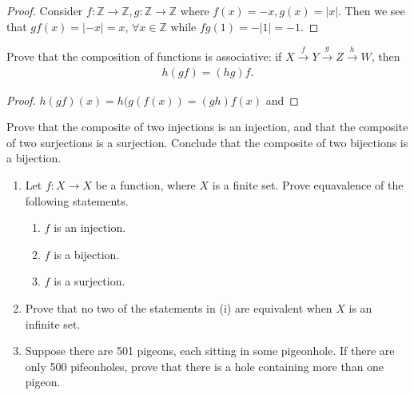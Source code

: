\documentclass[12pt]{article}
\newenvironment{exercise}[2][Exercise]{\begin{trivlist}
\item[\hskip \labelsep {\bfseries #1}\hskip \labelsep {\bfseries #2.}]}
{\end{trivlist}}
\begin{document}
 \begin{proof}
    Consider $f:\mathbb{Z}\rightarrow\mathbb{Z}, g:\mathbb{Z}\rightarrow\mathbb{Z}$ where $f(x) = -x, g(x) = |x|$. Then we see that ${gf(x)=|-x|=x}$,  $\forall x\in \mathbb{Z}$ while ${fg(1)=-|1|=-1}$.
 \end{proof}

 \begin{exercise}{1.6}

Prove that the composition of functions is associative: if $X\xrightarrow{f}Y\xrightarrow{g}Z\xrightarrow{h}W$, then \begin{align*}h(gf)=(hg)f.\end{align*}
 \end{exercise}
\begin{proof}
     $h(gf) (x) = h(g(f(x)) = (gh)f(x)$ and 
\end{proof}

\begin{exercise}{1.7}

Prove that the composite of two injections is an injection, and that the composite of two surjections is a surjection. Conclude that the composite of two bijections is a bijection.
\end{exercise}

\begin{exercise}{1.8 (Pigeonhole Principle)}
    \begin{enumerate}

        \item[(i)] Let $f:X\rightarrow X$ be a function, where $X$ is a finite set. Prove equavalence of the following statements.
        \begin{enumerate}
            \item[(a)] $f$ is an injection.
            \item[(b)] $f$ is a bijection.
            \item[(c)] $f$ is a surjection.
        \end{enumerate}

        \item[(ii)] Prove that no two of the statements in (i) are equivalent when $X$ is an infinite set.
        \item[(iii)] Suppose there are 501 pigeons, each sitting in some pigeonhole. If there are only 500 pifeonholes, prove that there is a hole containing more than one pigeon.
    \end{enumerate}
\end{exercise}
\end{document}
